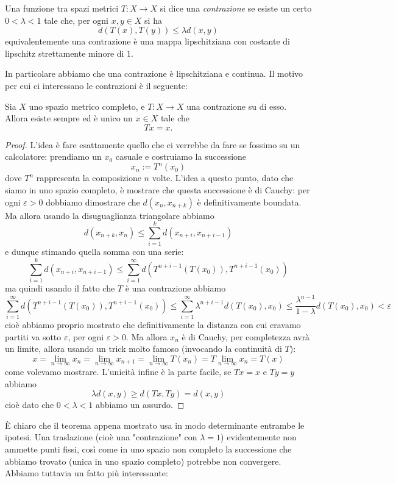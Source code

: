 \documentclass[11pt]{scrartcl}
\begin{document}
	\begin{definition}[Contrazione]
		Una funzione tra spazi metrici $T:X\to X$ si dice una \textit{contrazione} se esiste un certo $0<\lambda<1$ tale che, per ogni $x,y\in X$ si ha 
		$$d\left(T(x),T(y)\right)\le \lambda d\left(x,y\right)$$
		equivalentemente una contrazione è una mappa lipschitziana con costante di lipschitz strettamente minore di $1$. 
	\end{definition}
	In particolare abbiamo che una contrazione è lipschitziana e continua. Il motivo per cui ci interessano le contrazioni è il seguente:
	\begin{theorem}
		Sia $X$ uno spazio metrico completo, e $T:X\to X$ una contrazione su di esso. Allora esiste sempre ed è unico un $x\in X$ tale che
		$$Tx=x.$$
	\end{theorem}
	\begin{proof}
		L'idea è fare esattamente quello che ci verrebbe da fare se fossimo su un calcolatore: prendiamo un $x_0$ casuale e costruiamo la successione
		$$x_n:= T^n(x_0)$$
		dove $T^n$ rappresenta la composizione $n$ volte. L'idea a questo punto, dato che siamo in uno spazio completo, è mostrare che questa successione è di Cauchy: per ogni $\varepsilon>0$ dobbiamo dimostrare che $d(x_n,x_{n+k})$ è definitivamente boundata. Ma allora usando la disuguaglianza triangolare abbiamo
		$$d(x_{n+k},x_n)\le \sum_{i=1}^{k}d\left(x_{n+i},x_{n+i-1}\right)$$
		e dunque stimando quella somma con una serie:
		$$\sum_{i=1}^{k}d\left(x_{n+i},x_{n+i-1}\right) \le \sum_{i=1}^{\infty}d\left(T^{n+i-1}(T(x_0)),T^{n+i-1}(x_0)\right)$$
		ma quindi usando il fatto che $T$ è una contrazione abbiamo
		$$\sum_{i=1}^{\infty}d\left(T^{n+i-1}(T(x_0)),T^{n+i-1}(x_0)\right)\le \sum_{i=1}^{\infty}\lambda^{n+i-1}d(T(x_0),x_0)\le \frac{\lambda^{n-1}}{1-\lambda}d\left(T(x_0),x_0\right)<\varepsilon$$
		cioè abbiamo proprio mostrato che definitivamente la distanza con cui eravamo partiti va sotto $\varepsilon$, per ogni $\varepsilon>0$. Ma allora $x_n$ è di Cauchy, per completezza avrà un limite, allora usando un trick molto famoso (invocando la continuità di $T$):
		$$x=\lim_{n\to\infty}x_n=\lim_{n\to\infty}x_{n+1}=\lim_{n\to\infty}T(x_n)=T\lim_{n\to\infty}x_n=T(x)$$
		come volevamo mostrare. L'unicità infine è la parte facile, se $Tx=x$ e $Ty=y$ abbiamo
		$$\lambda d(x,y)\ge d\left(Tx,Ty\right)=d(x,y)$$
		cioè dato che $0<\lambda<1$ abbiamo un assurdo.
	\end{proof}
	\`E chiaro che il teorema appena mostrato usa in modo determinante entrambe le ipotesi. Una traslazione (cioè una "contrazione" con $\lambda=1$) evidentemente non ammette punti fissi, così come in uno spazio non completo la successione che abbiamo trovato (unica in uno spazio completo) potrebbe non convergere. Abbiamo tuttavia un fatto più interessante:
\end{document}
